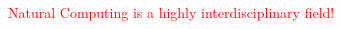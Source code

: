 \documentclass[	hyperref={pdfpagelabels=false}, xcolor=dvipsnames,
		11pt]{beamer}
\begin{document}
\begin{frame}
\begin{columns}
\begin{column}{5cm}
\begin{overprint}
{\begin{minipage}[t]{5 cm}
\begin{figure}[h]
\begin{center}
		\end{center}
	\end{figure}
	\end{minipage} }

	\end{overprint}
	\end{column}
	\end{columns}

	\begin{center}
		\textcolor{red}{Natural Computing is a highly interdisciplinary field!}
	\end{center}
\end{frame}
\end{document}
